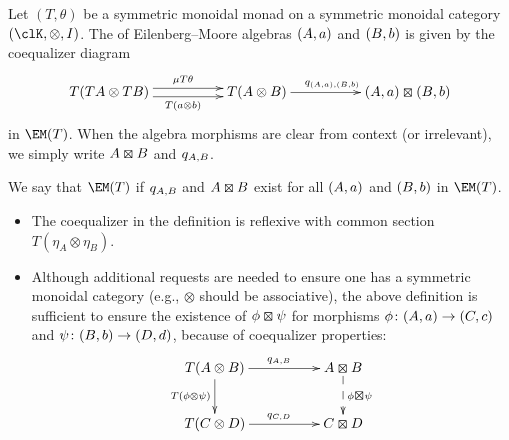\begin{definition}\label{def:kocktensor}
	Let $(T,\theta)$ be a symmetric monoidal monad on a symmetric monoidal category $(\clK,\otimes,I)$.
	The  of Eilenberg--Moore algebras $({A},a)$ and $({B},b)$ is given by the coequalizer diagram
	\begin{equation*}%
		\xymatrix@C=5em{
		T(T\A\otimes T\B)
		\ar@<.7ex>[r]^{\mu T\theta }
		\ar@<-.7ex>[r]_{T(a\otimes b)}
		& T(\A\otimes \B)\ar[r]^{q_{(\A,a),(\B,b)}} & (\A,a)\kocktensor (\B,b)
		}
	\end{equation*}
	in $\EM(T)$.
	When the algebra morphisms are clear from context (or irrelevant), we simply write $\A \kocktensor \B$ and $q_{{A},{B}}$.

	We say that $\EM(T)$  if $q_{{A},{B}}$ and $\A \kocktensor \B$ exist for all $({A},a)$ and $({B},b)$ in $\EM(T)$.
\end{definition}
\begin{remark}\label{rem:coeq_homtensor}
	\begin{itemize}
		\item  The coequalizer in the definition is reflexive with common section $T(\eta_A\otimes \eta_B)$.
		\item Although additional requests are needed to ensure one has a symmetric monoidal category (e.g., $\otimes$ should be associative), the above definition is sufficient to ensure the existence of $\phi\kocktensor \psi$ for morphisms $\phi\colon ({A},a) \to ({C},c)$ and $\psi\colon ({B},b)\to ({D},d)$, because of coequalizer properties:
		      \[
			      \xymatrix@C=5em{
			      T(\A\otimes \B)\ar[r]^{q_{\A,\B}}\ar[d]_{T(\phi\otimes \psi)} & \A\kocktensor \B\ar@{-->}[d]^{\phi\kocktensor \psi} \\
			      T(\C\otimes \D)\ar[r]^{q_{\C,\D}} & \C\kocktensor \D
			      }
		      \]
	\end{itemize}

\end{remark}



